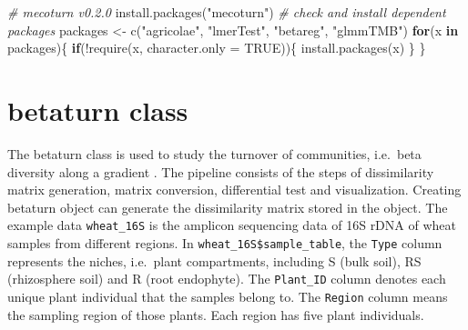 \documentclass[
]{book}
\newenvironment{Shaded}{\begin{snugshade}}{\end{snugshade}}
\newcommand{\AttributeTok}[1]{\textcolor[rgb]{0.77,0.63,0.00}{#1}}
\newcommand{\CommentTok}[1]{\textcolor[rgb]{0.56,0.35,0.01}{\textit{#1}}}
\newcommand{\ConstantTok}[1]{\textcolor[rgb]{0.00,0.00,0.00}{#1}}
\newcommand{\ControlFlowTok}[1]{\textcolor[rgb]{0.13,0.29,0.53}{\textbf{#1}}}
\newcommand{\FunctionTok}[1]{\textcolor[rgb]{0.00,0.00,0.00}{#1}}
\newcommand{\NormalTok}[1]{#1}
\newcommand{\OtherTok}[1]{\textcolor[rgb]{0.56,0.35,0.01}{#1}}
\newcommand{\SpecialCharTok}[1]{\textcolor[rgb]{0.00,0.00,0.00}{#1}}
\newcommand{\StringTok}[1]{\textcolor[rgb]{0.31,0.60,0.02}{#1}}
\begin{document}
\begin{Shaded}
\begin{Highlighting}[]
\CommentTok{\# mecoturn v0.2.0}
\FunctionTok{install.packages}\NormalTok{(}\StringTok{"mecoturn"}\NormalTok{)}
\CommentTok{\# check and install dependent packages}
\NormalTok{packages }\OtherTok{\textless{}{-}} \FunctionTok{c}\NormalTok{(}\StringTok{"agricolae"}\NormalTok{, }\StringTok{"lmerTest"}\NormalTok{, }\StringTok{"betareg"}\NormalTok{, }\StringTok{"glmmTMB"}\NormalTok{)}
\ControlFlowTok{for}\NormalTok{(x }\ControlFlowTok{in}\NormalTok{ packages)\{}
    \ControlFlowTok{if}\NormalTok{(}\SpecialCharTok{!}\FunctionTok{require}\NormalTok{(x, }\AttributeTok{character.only =} \ConstantTok{TRUE}\NormalTok{))\{}
        \FunctionTok{install.packages}\NormalTok{(x)}
\NormalTok{    \}}
\NormalTok{\}}
\end{Highlighting}
\end{Shaded}

\hypertarget{betaturn-class}{%
\section{betaturn class}\label{betaturn-class}}

The betaturn class is used to study the turnover of communities, i.e.~beta diversity along a gradient \citep{Anderson_Navigating_2011}.
The pipeline consists of the steps of dissimilarity matrix generation, matrix conversion, differential test and visualization.
Creating betaturn object can generate the dissimilarity matrix stored in the object.
The example data \texttt{wheat\_16S} is the amplicon sequencing data of 16S rDNA of wheat samples from different regions.
In \texttt{wheat\_16S\$sample\_table}, the \texttt{Type} column represents the niches, i.e.~plant compartments, including S (bulk soil), RS (rhizosphere soil) and R (root endophyte).
The \texttt{Plant\_ID} column denotes each unique plant individual that the samples belong to.
The \texttt{Region} column means the sampling region of those plants.
Each region has five plant individuals.

\begin{Shaded}
\end{Shaded}
\end{document}
